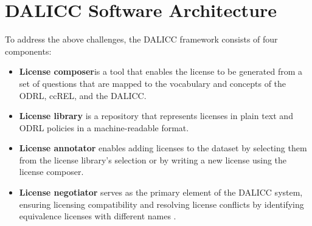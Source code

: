\section{DALICC Software Architecture}
To address the above challenges, the DALICC framework consists of four components:\\
\begin{itemize}
	\item \textbf{License composer}is a tool that enables the license to be generated from a set of questions that are mapped to the vocabulary and concepts of the ODRL, ccREL, and the DALICC.
	\item \textbf{License library} is a repository that represents licenses in plain text and ODRL policies in a machine-readable format.
	\item \textbf{License annotator}  enables adding licenses to the dataset by selecting them from the license library's selection or by writing a new license using the license composer.
	\item \textbf{License negotiator} serves as the primary element of the DALICC system, ensuring licensing compatibility and resolving license conflicts by identifying equivalence licenses with different names \cite{Anna}.
\end{itemize}
